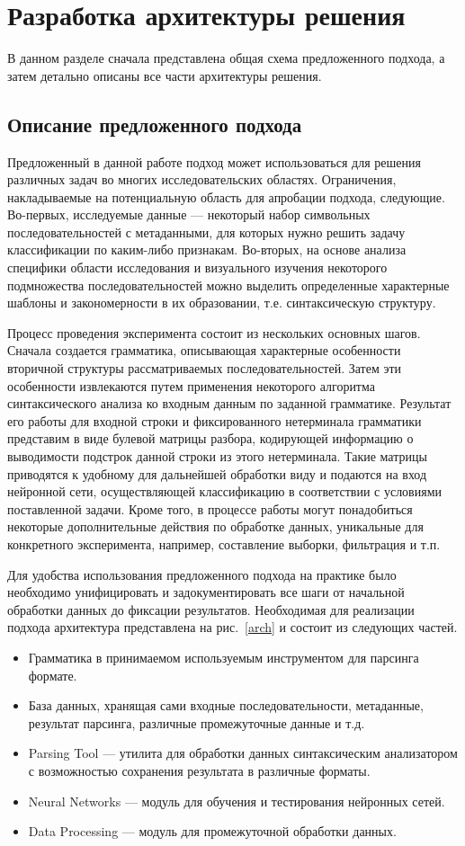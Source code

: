 \section{Разработка архитектуры решения}
В данном разделе сначала представлена общая схема предложенного подхода, а затем детально описаны все части архитектуры решения.
\subsection{Описание предложенного подхода}
Предложенный в данной работе подход может использоваться для решения различных задач во многих исследовательских областях. Ограничения, накладываемые на потенциальную область для апробации подхода, следующие. Во-первых, исследуемые данные --- некоторый набор символьных последовательностей с метаданными, для которых нужно решить задачу классификации по каким-либо признакам. Во-вторых, на основе анализа специфики области исследования и визуального изучения некоторого подмножества последовательностей можно выделить определенные характерные шаблоны и закономерности в их образовании, т.е. синтаксическую структуру.

Процесс проведения эксперимента состоит из нескольких основных шагов. Сначала создается грамматика, описывающая характерные особенности вторичной структуры рассматриваемых последовательностей. Затем эти особенности извлекаются путем применения некоторого алгоритма синтаксического анализа ко входным данным по заданной грамматике. Результат его работы для входной строки и фиксированного нетерминала грамматики представим в виде булевой матрицы разбора, кодирующей информацию о выводимости подстрок данной строки из этого нетерминала. Такие матрицы приводятся к удобному для дальнейшей обработки виду и подаются на вход нейронной сети, осуществляющей классификацию в соответствии с условиями поставленной задачи. Кроме того, в процессе работы могут понадобиться некоторые дополнительные действия по обработке данных, уникальные для конкретного эксперимента, например, составление выборки, фильтрация и т.п.

Для удобства использования предложенного подхода на практике было необходимо унифицировать и задокументировать все шаги от начальной обработки данных до фиксации результатов. Необходимая для реализации подхода архитектура представлена на рис.~\ref{arch} и состоит из следующих частей.
\begin{itemize}
    \item Грамматика в принимаемом используемым инструментом для парсинга формате.
    \item База данных, хранящая сами входные последовательности, метаданные, результат парсинга, различные промежуточные данные и т.д.
    \item Parsing Tool --- утилита для обработки данных синтаксическим анализатором с возможностью сохранения результата в различные форматы.
    \item Neural Networks --- модуль для обучения и тестирования нейронных сетей.
    \item Data Processing --- модуль для промежуточной обработки данных.
\end{itemize}

